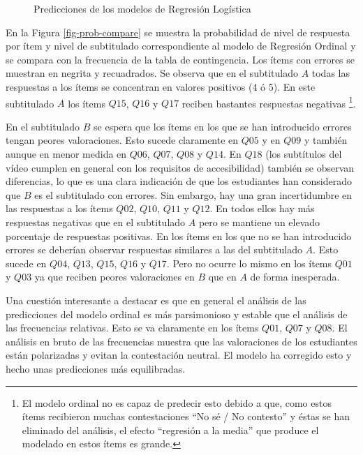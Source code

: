 \documentclass[
  12pt,
  a4paper,
  extrafontsizes,
  onecolumn,
  openright,
  table]{memoir}
\begin{document}
\begin{figure}
\begin{minipage}[t]{0.50\linewidth}
{{}

}

\end{minipage}%

\caption{\label{fig-logistic-compare}Predicciones de los modelos de
Regresión Logística}

\end{figure}

En la Figura \ref{fig-prob-compare} se muestra la probabilidad de nivel
de respuesta por ítem y nivel de subtitulado correspondiente al modelo
de Regresión Ordinal y se compara con la frecuencia de la tabla de
contingencia. Los ítems con errores se muestran en negrita y
recuadrados. Se observa que en el subtitulado \(A\) todas las respuestas
a los ítems se concentran en valores positivos (4 ó 5). En este
subtitulado \(A\) los ítems \(Q15\), \(Q16\) y \(Q17\) reciben bastantes
respuestas negativas \footnote{El modelo ordinal no es capaz de predecir
  esto debido a que, como estos ítems recibieron muchas contestaciones
  \enquote{No sé / No contesto} y éstas se han eliminado del análisis,
  el efecto \enquote{regresión a la media} que produce el modelado en
  estos ítems es grande.}.

En el subtitulado \(B\) se espera que los ítems en los que se han
introducido errores tengan peores valoraciones. Esto sucede claramente
en \(Q05\) y en \(Q09\) y también aunque en menor medida en \(Q06\),
\(Q07\), \(Q08\) y \(Q14\). En \(Q18\) (los subtítulos del vídeo cumplen
en general con los requisitos de accesibilidad) también se observan
diferencias, lo que es una clara indicación de que los estudiantes han
considerado que \(B\) es el subtitulado con errores. Sin embargo, hay
una gran incertidumbre en las respuestas a los ítems \(Q02\), \(Q10\),
\(Q11\) y \(Q12\). En todos ellos hay más respuestas negativas que en el
subtitulado \(A\) pero se mantiene un elevado porcentaje de respuestas
positivas. En los ítems en los que no se han introducido errores se
deberían observar respuestas similares a las del subtitulado \(A\). Esto
sucede en \(Q04\), \(Q13\), \(Q15\), \(Q16\) y \(Q17\). Pero no ocurre
lo mismo en los ítems \(Q01\) y \(Q03\) ya que reciben peores
valoraciones en \(B\) que en \(A\) de forma inesperada.

Una cuestión interesante a destacar es que en general el análisis de las
predicciones del modelo ordinal es más parsimonioso y estable que el
análisis de las frecuencias relativas. Esto se va claramente en los
ítems \(Q01\), \(Q07\) y \(Q08\). El análisis en bruto de las
frecuencias muestra que las valoraciones de los estudiantes están
polarizadas y evitan la contestación neutral. El modelo ha corregido
esto y hecho unas predicciones más equilibradas.
\end{document}
